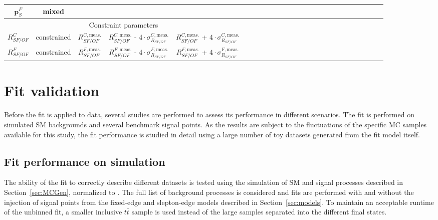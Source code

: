 \begin{table}[htbp]
\begin{center}
\begin{tabular}{c|c|c|c|ccccccccccccccccccccc}
$\mathbf{p}_{S}^{F}$ & mixed & \multicolumn{3}{c}{}\\ \hline
\multicolumn{5}{c}{Constraint parameters}\\ \hline
$R_{SF/OF}^{C}$ & constrained & $R_{SF/OF}^{C,\text{meas.}}$  & $R_{SF/OF}^{C,\text{meas.}}$ - $4\cdot \sigma_{R_{SF/OF}}^{C,\text{meas.}}$ & $R_{SF/OF}^{C,\text{meas.}}$ + $4\cdot \sigma_{R_{SF/OF}}^{C,\text{meas.}}$ \\
$R_{SF/OF}^{F}$ & constrained & $R_{SF/OF}^{F,\text{meas.}}$  & $R_{SF/OF}^{F,\text{meas.}}$ - $4\cdot \sigma_{R_{SF/OF}}^{F,\text{meas.}}$ & $R_{SF/OF}^{F,\text{meas.}}$ + $4\cdot \sigma_{R_{SF/OF}}^{F,\text{meas.}}$ \\
\end{tabular}

\end{center}
\end{table}


\section{Fit validation}
Before the fit is applied to data, several studies are performed to assess its performance in different scenarios. The fit is performed on simulated SM backgrounds and several benchmark signal points. As the results are subject to the fluctuations of the specific MC samples available for this study, the fit performance is studied in detail using a large number of toy datasets generated from the fit model itself. 
\subsection{Fit performance on simulation}
The ability of the fit to correctly describe different datasets is tested using the simulation of SM and signal processes described in Section~\ref{sec:MCGen}, normalized to \lumi. The full list of background processes is considered and fits are performed with and without the injection of signal points from the fixed-edge and slepton-edge models described in Section~\ref{sec:models}. To maintain an acceptable runtime of the unbinned fit, a smaller inclusive $t\bar{t}$ sample is used instead of the large samples separated into the different final states. 

